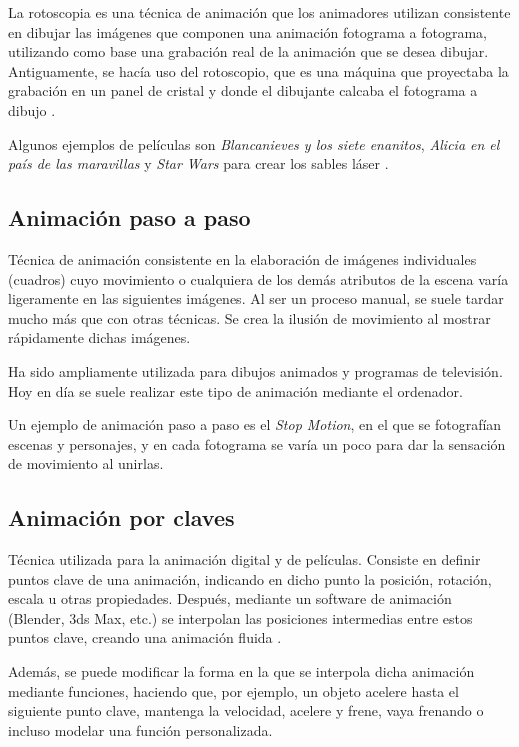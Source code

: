 \documentclass{article}
\begin{document}
La rotoscopia es una técnica de animación que los animadores utilizan consistente en dibujar las imágenes que componen una animación fotograma a fotograma, utilizando como base una grabación real de la animación que se desea dibujar. Antiguamente, se hacía uso del rotoscopio, que es una máquina que proyectaba la grabación en un panel de cristal y donde el dibujante calcaba el fotograma a dibujo \cite{rotos}.

\bigskip

Algunos ejemplos de películas son \textit{Blancanieves y los siete enanitos}, \textit{Alicia en el país de las maravillas} \cite{pelis} y \textit{Star Wars} para crear los sables láser \cite{rotos}.

\subsection{Animación paso a paso}

Técnica de animación consistente en la elaboración de imágenes individuales (cuadros) cuyo movimiento o cualquiera de los demás atributos de la escena varía ligeramente en las siguientes imágenes. Al ser un proceso manual, se suele tardar mucho más que con otras técnicas. Se crea la ilusión de movimiento al mostrar rápidamente dichas imágenes. 

\bigskip

Ha sido ampliamente utilizada para dibujos animados y programas de televisión. Hoy en día se suele realizar este tipo de animación mediante el ordenador. 

\bigskip

Un ejemplo de animación paso a paso es el \textit{Stop Motion}, en el que se fotografían escenas y personajes, y en cada fotograma se varía un poco para dar la sensación de movimiento al unirlas.


\subsection{Animación por claves}

Técnica utilizada para la animación digital y de películas. Consiste en definir puntos clave de una animación, indicando en dicho punto la posición, rotación, escala u otras propiedades. Después, mediante un software de animación (Blender, 3ds Max, etc.) se interpolan las posiciones intermedias entre estos puntos clave, creando una animación fluida \cite{keyframe}.

\bigskip

Además, se puede modificar la forma en la que se interpola dicha animación mediante funciones, haciendo que, por ejemplo, un objeto acelere hasta el siguiente punto clave, mantenga la velocidad, acelere y frene, vaya frenando o incluso modelar una función personalizada.
\end{document}
